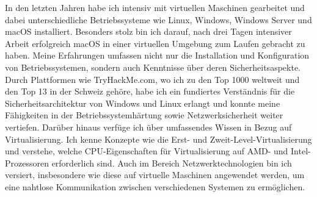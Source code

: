 \documentclass[11pt, a4paper]{awesome-cv}
\begin{document}
\begin{cvletter}
In den letzten Jahren habe ich intensiv mit virtuellen Maschinen gearbeitet und dabei unterschiedliche Betriebssysteme wie Linux, Windows, Windows Server und  macOS installiert. Besonders stolz bin ich darauf, nach drei Tagen intensiver Arbeit erfolgreich macOS in einer virtuellen Umgebung zum Laufen gebracht zu haben.
Meine Erfahrungen umfassen nicht nur die Installation und Konfiguration von Betriebssystemen, sondern auch Kenntnisse über deren Sicherheitsaspekte. Durch Plattformen wie TryHackMe.com, wo ich zu den Top 1000 weltweit und den Top 13 in der Schweiz gehöre, habe ich ein fundiertes Verständnis für die Sicherheitsarchitektur von Windows und Linux erlangt und konnte meine Fähigkeiten in der Betriebssystemhärtung sowie Netzwerksicherheit weiter vertiefen.
Darüber hinaus verfüge ich über umfassendes Wissen in Bezug auf Virtualisierung. Ich kenne Konzepte wie die Erst- und Zweit-Level-Virtualisierung und verstehe, welche CPU-Eigenschaften für Virtualisierung auf AMD- und Intel-Prozessoren erforderlich sind. Auch im Bereich Netzwerktechnologien bin ich versiert, insbesondere wie diese auf virtuelle Maschinen angewendet werden, um eine nahtlose Kommunikation zwischen verschiedenen Systemen zu ermöglichen.



\end{cvletter}


\makeletterclosing
\end{document}
